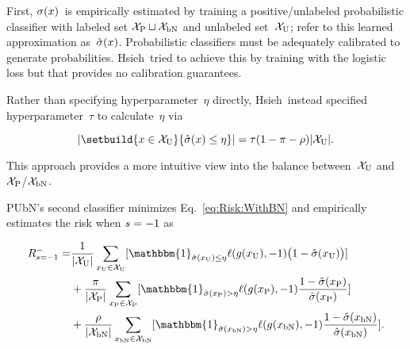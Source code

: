 First, $\sigma(x)$~is empirically estimated by training a positive\-/unlabeled probabilistic classifier with labeled set ${\mathcal{X}_{\textnormal{P}} \sqcup \mathcal{X}_{\textnormal{bN}}}$ and unlabeled set~$\mathcal{X}_{\textnormal{U}}$; refer to this learned approximation as~$\hat{\sigma}(x)$.  Probabilistic classifiers must be adequately calibrated to generate probabilities.  Hsieh\etal\ tried to achieve this by training with the logistic loss but that provides no calibration guarantees.~\cite{Guo:2017}

Rather than specifying hyperparameter~$\eta$ directly, Hsieh\etal\ instead specified hyperparameter~$\tau$ to calculate~$\eta$ via

\begin{equation}\label{eq:EtaCalculation}
  \abs{\setbuild{\X \in \utrain}{\hsigX \leq \eta}} = \tau (1 - \prior - \plabel)\abs{\utrain} \text{.}
\end{equation}

\noindent
This approach provides a more intuitive view into the balance between~$\mathcal{X}_{\textnormal{U}}$ and $\mathcal{X}_{\textnormal{P}}$/$\mathcal{X}_{\textnormal{bN}}$.

PUbN's second classifier minimizes Eq.~\eqref{eq:Risk:WithBN} and empirically estimates the risk when ${s = {-}1}$ as

\begin{equation}\label{eq:EmpRisk:PUbN:Latent}
  \begin{aligned}
    \smrisk = &\frac{1}{\abs{\utrain}} \sum_{\xvar{U} \in \utrain} \sbrack{\mathbbm{1}_{\hsig(\xvar{U}) \leq \eta} \floss{\dec(\xvar{U})}{\ncls} \big(1 - \hsig(\xvar{U})\big)} \\
              &+\frac{\prior}{\abs{\ptrain}} \sum_{\xvar{P} \in \ptrain} \sbrack{\mathbbm{1}_{\hsig(\xvar{P}) > \eta} \floss{\dec(\xvar{P})}{\ncls} \frac{1 - \hsig(\xvar{P})}{\hsig(\xvar{P})}} \\
              &+\frac{\plabel}{\abs{\bntrain}} \sum_{\xvar{bN} \in \bntrain} \sbrack{\mathbbm{1}_{\hsig(\xvar{bN}) > \eta} \floss{\dec(\xvar{bN})}{\ncls} \frac{1 - \hsig(\xvar{bN})}{\hsig(\xvar{bN})}} \text{.}
  \end{aligned}
\end{equation}
